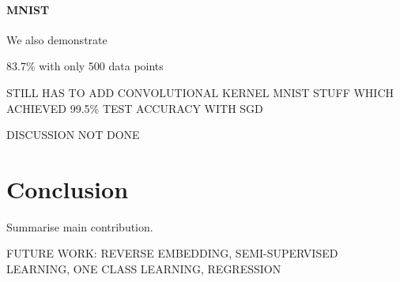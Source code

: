 \documentclass{article}
\newcommand{\note}[1]{{\color{orange} #1}}
\begin{document}
	\paragraph{MNIST}
	
		We also demonstrate
		
		83.7\% with only 500 data points 
		
		STILL HAS TO ADD CONVOLUTIONAL KERNEL MNIST STUFF WHICH ACHIEVED 99.5\% TEST ACCURACY WITH SGD
		
		DISCUSSION NOT DONE 

		
%	
\section{Conclusion}

	
	\note{Summarise main contribution.}
	
	FUTURE WORK: REVERSE EMBEDDING, SEMI-SUPERVISED LEARNING, ONE CLASS LEARNING, REGRESSION
	
\end{document}
